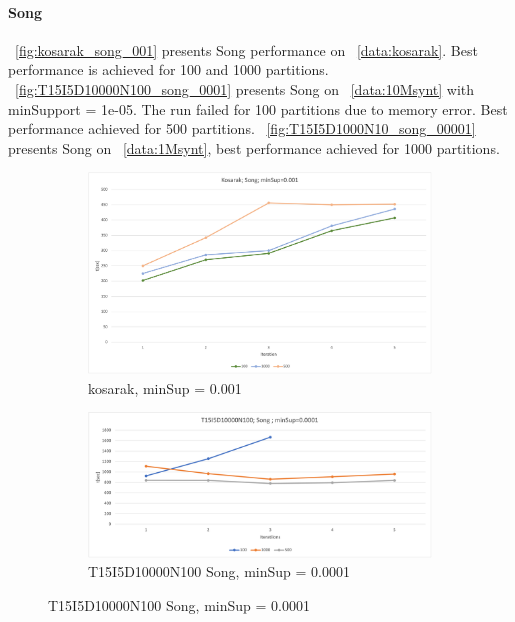\paragraph{Song}
~\autoref{fig:kosarak_song_001} presents Song performance on ~\autoref{data:kosarak}. Best performance is achieved for 100 and 1000 partitions. ~\autoref{fig:T15I5D10000N100_song_0001} presents Song on ~\autoref{data:10Msynt} with minSupport = 1e-05. The run failed for 100 partitions due to memory error. Best performance achieved for 500 partitions.
~\autoref{fig:T15I5D1000N10_song_00001} presents Song on ~\autoref{data:1Msynt}, best performance achieved for 1000 partitions.


\begin{figure}[H]
  \centering
  \begin{subfigure}{\textwidth}
	  \centering
 	 \includegraphics[width=\linewidth]{figures/4iterations/kosarak_song_001}
	  \caption{kosarak, minSup = 0.001}
	  \label{fig:kosarak_song_001}
  \end{subfigure}
  \begin{subfigure}{\textwidth}
    \centering
	  \includegraphics[width=\linewidth]{figures/4iterations/T15I5D10000N100_song_0001}
	  \caption{T15I5D10000N100 Song, minSup = 0.0001}
	  \label{fig:T15I5D10000N100_song_0001}

\end{subfigure}
\end{figure}
